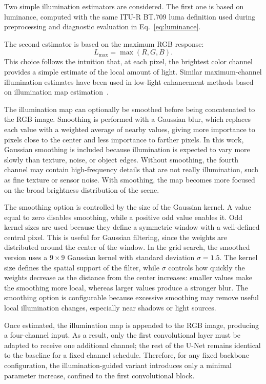 Two simple illumination estimators are considered. The first one is based on luminance, computed with the same ITU-R BT.709 luma definition used during preprocessing and diagnostic evaluation in Eq.~\ref{eq:luminance}.

The second estimator is based on the maximum RGB response:
\begin{equation}
	L_{\max}
	=
	\max(R,G,B).
\end{equation}
This choice follows the intuition that, at each pixel, the brightest color channel provides a simple estimate of the local amount of light. Similar maximum-channel illumination estimates have been used in low-light enhancement methods based on illumination map estimation~\cite{DBLP:journals/tip/GuoLL17}.

The illumination map can optionally be smoothed before being concatenated to the RGB image. Smoothing is performed with a Gaussian blur, which replaces each value with a weighted average of nearby values, giving more importance to pixels close to the center and less importance to farther pixels. In this work, Gaussian smoothing is included because illumination is expected to vary more slowly than texture, noise, or object edges. Without smoothing, the fourth channel may contain high-frequency details that are not really illumination, such as fine texture or sensor noise. With smoothing, the map becomes more focused on the broad brightness distribution of the scene.

The smoothing option is controlled by the size of the Gaussian kernel. A value equal to zero disables smoothing, while a positive odd value enables it. Odd kernel sizes are used because they define a symmetric window with a well-defined central pixel. This is useful for Gaussian filtering, since the weights are distributed around the center of the window. In the grid search, the smoothed version uses a $9 \times 9$ Gaussian kernel with standard deviation $\sigma = 1.5$. The kernel size defines the spatial support of the filter, while $\sigma$ controls how quickly the weights decrease as the distance from the center increases: smaller values make the smoothing more local, whereas larger values produce a stronger blur. The smoothing option is configurable because excessive smoothing may remove useful local illumination changes, especially near shadows or light sources.

Once estimated, the illumination map is appended to the RGB image, producing a four-channel input. As a result, only the first convolutional layer must be adapted to receive one additional channel; the rest of the U-Net remains identical to the baseline for a fixed channel schedule. Therefore, for any fixed backbone configuration, the illumination-guided variant introduces only a minimal parameter increase, confined to the first convolutional block.

